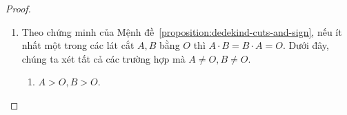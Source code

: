 \begin{proof}
\begin{enumerate}[label={(\roman*)}]
\begin{enumerate}[label={\textbf{Trường hợp \arabic*.}},itemindent=1cm]
\begin{align*}
                                              & = -((-A)\cdot (-B))\cdot (-C) & \text{(theo Mệnh đề~\ref{proposition:dedekind-cuts-and-sign})}       \\
                                              & = -(-A)\cdot ((-B)\cdot (-C)) & \text{(theo \textbf{Trường hợp 1})}                                  \\
                                              & = -(-A)\cdot (B\cdot C)       & \text{(theo Mệnh đề~\ref{proposition:dedekind-cuts-and-sign})}       \\
                                              & = (-(-A))\cdot (B\cdot C)     & \text{(theo Mệnh đề~\ref{proposition:dedekind-cuts-and-sign})}       \\
                                              & = A\cdot (B\cdot C)           & \text{(theo Định lý~\ref{theorem:additive-inversion-is-involutive})}
                        \end{align*}
              \end{enumerate}

              Như vậy, với mọi lát cắt $A, B, C$, chúng ta có $(A\cdot B)\cdot C = A\cdot (B\cdot C)$.
        \item Theo chứng minh của Mệnh đề~\ref{proposition:dedekind-cuts-and-sign}, nếu ít nhất một trong các lát cắt $A, B$ bằng $O$ thì $A\cdot B = B\cdot A = O$. Dưới đây, chúng ta xét tất cả các trường hợp mà $A\ne O, B\ne O$.
              \begin{enumerate}[label={\textbf{Trường hợp \arabic*.}},itemindent=1cm]
                  \item $A > O, B > O$.


\end{enumerate}
\end{enumerate}
\end{proof}
